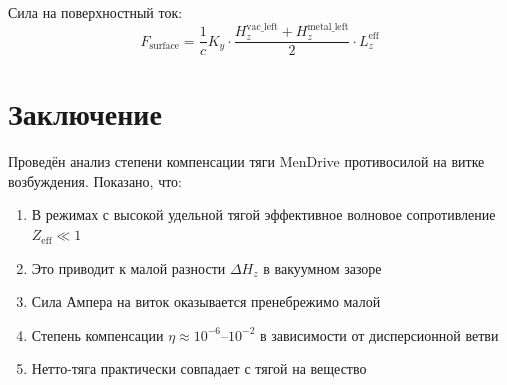 \documentclass[a4paper,12pt]{article}
\begin{document}
Сила на поверхностный ток:
\begin{equation}
F_{\text{surface}} = \frac{1}{c} K_y \cdot \frac{H_z^{\text{vac\_left}} + H_z^{\text{metal\_left}}}{2} \cdot L_z^{\text{eff}}
\end{equation}

\section{Заключение}

Проведён анализ степени компенсации тяги MenDrive противосилой на витке возбуждения. Показано, что:

\begin{enumerate}
    \item В режимах с высокой удельной тягой эффективное волновое сопротивление $Z_{\text{eff}} \ll 1$
    \item Это приводит к малой разности $\Delta H_z$ в вакуумном зазоре
    \item Сила Ампера на виток оказывается пренебрежимо малой
    \item Степень компенсации $\eta \approx 10^{-6}$--$10^{-2}$ в зависимости от дисперсионной ветви
    \item Нетто-тяга практически совпадает с тягой на вещество
\end{enumerate}
\end{document}
